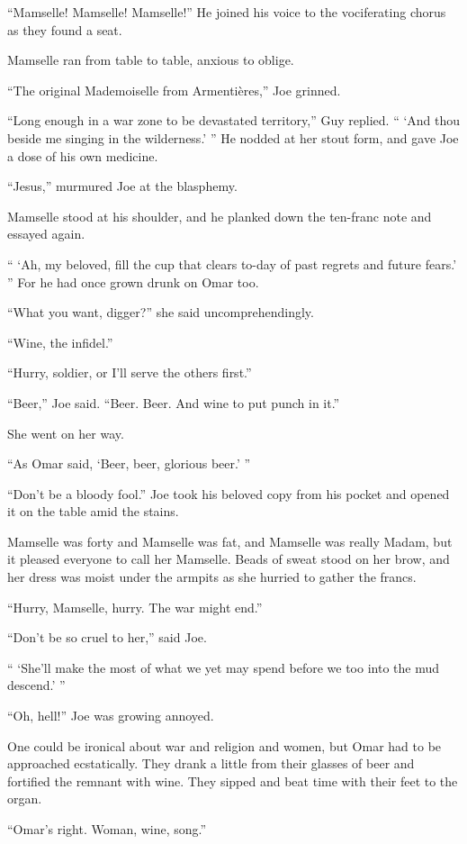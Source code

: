 ``Mamselle! Mamselle! Mamselle!'' He joined his voice to the vociferating chorus as they found a seat.

Mamselle ran from table to table, anxious to oblige.

``The original Mademoiselle from Armenti\`{e}res,'' Joe grinned.

``Long enough in a war zone to be devastated territory,'' Guy replied. `` `And thou beside me singing in the wilderness.' '' He nodded at her stout form, and gave Joe a dose of his own medicine.

``Jesus,'' murmured Joe at the blasphemy.

Mamselle stood at his shoulder, and he planked down the ten-franc note and essayed again.

`` `Ah, my beloved, fill the cup that clears to-day of past regrets and future fears.' '' For he had once grown drunk on Omar too.

``What you want, digger?'' she said uncomprehendingly.

``Wine, the infidel.''

``Hurry, soldier, or I'll serve the others first.''

``Beer,'' Joe said. ``Beer. Beer. And wine to put punch in it.''

She went on her way.

``As Omar said, `Beer, beer, glorious beer.' ''

``Don't be a bloody fool.'' Joe took his beloved copy from his pocket and opened it on the table amid the stains.

Mamselle was forty and Mamselle was fat, and Mamselle was really Madam, but it pleased everyone to call her Mamselle. Beads of sweat stood on her brow, and her dress was moist under the armpits as she hurried to gather the francs.

``Hurry, Mamselle, hurry. The war might end.''

``Don't be so cruel to her,'' said Joe.

`` `She'll make the most of what we yet may spend before we too into the mud descend.' ''

``Oh, hell!'' Joe was growing annoyed.

One could be ironical about war and religion and women, but Omar had to be approached ecstatically. They drank a little from their glasses of beer and fortified the remnant with wine. They sipped and beat time with their feet to the organ.

``Omar's right. Woman, wine, song.''

